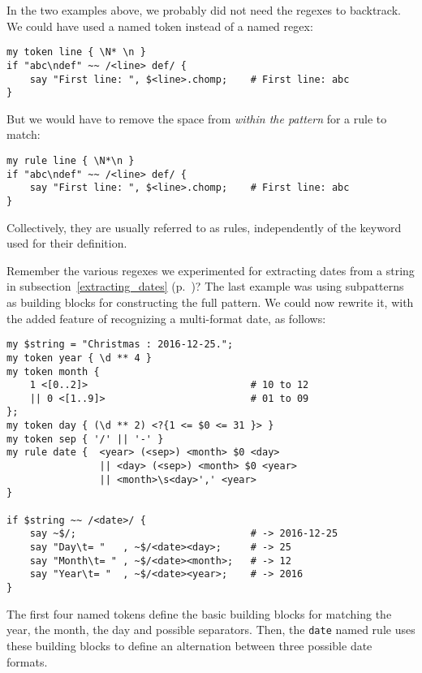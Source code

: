 In the two examples above, we probably did not need the 
regexes to backtrack. We could have used a named token 
instead of a named regex:

\begin{verbatim}
my token line { \N* \n }
if "abc\ndef" ~~ /<line> def/ {
    say "First line: ", $<line>.chomp;    # First line: abc
}
\end{verbatim} 

But we would have to remove the space from \emph{within the pattern} for a rule to match:

\begin{verbatim}
my rule line { \N*\n }
if "abc\ndef" ~~ /<line> def/ {
    say "First line: ", $<line>.chomp;    # First line: abc
}
\end{verbatim} 

Collectively, they are usually referred to as rules, 
independently of the keyword used for their definition.

Remember the various regexes we experimented for 
extracting dates from a string in 
subsection~\ref{extracting_dates} 
(p.~\pageref{extracting_dates})? The last example was 
using subpatterns as building blocks for constructing 
the full pattern. We could now rewrite it, with the 
added feature of recognizing a multi-format date, as 
follows:

\begin{verbatim}
my $string = "Christmas : 2016-12-25.";                                         
my token year { \d ** 4 }                                        
my token month {   
    1 <[0..2]>                            # 10 to 12                     
    || 0 <[1..9]>                         # 01 to 09                     
};
my token day { (\d ** 2) <?{1 <= $0 <= 31 }> }  
my token sep { '/' || '-' } 
my rule date {  <year> (<sep>) <month> $0 <day> 
                || <day> (<sep>) <month> $0 <year> 
                || <month>\s<day>',' <year>
}                         

if $string ~~ /<date>/ {
    say ~$/;                              # -> 2016-12-25
    say "Day\t= "   , ~$/<date><day>;     # -> 25
    say "Month\t= " , ~$/<date><month>;   # -> 12
    say "Year\t= "  , ~$/<date><year>;    # -> 2016
}          
\end{verbatim} 

The first four named tokens define the basic building 
blocks for matching the year, the month, the day and 
possible separators. Then, the {\tt date}  
named rule uses these building blocks to define an 
alternation between three possible date formats.

